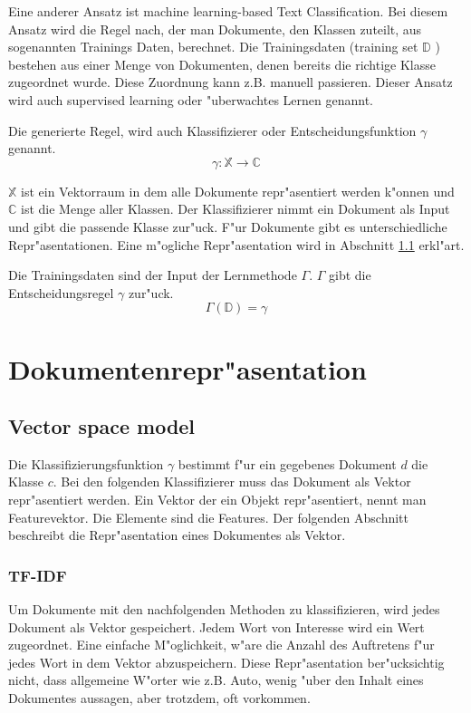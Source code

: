 \documentclass[12pt,a4paper,twoside]{article}
\begin{document}
Eine anderer Ansatz ist machine learning-based Text Classification. Bei diesem Ansatz wird die Regel nach, der man Dokumente, den Klassen zuteilt, aus sogenannten Trainings Daten, berechnet. Die Trainingsdaten (training set $\mathbb{D}$ ) bestehen aus einer Menge von Dokumenten, denen bereits die richtige Klasse zugeordnet wurde. Diese Zuordnung kann z.B. manuell passieren. Dieser Ansatz wird auch supervised learning oder "uberwachtes Lernen genannt. 

Die generierte Regel, wird auch Klassifizierer oder Entscheidungsfunktion $\gamma$ genannt.
\[
\gamma : \mathbb{X} \to \mathbb{C}
\]

$\mathbb{X}$ ist ein Vektorraum in dem alle Dokumente repr"asentiert werden k"onnen und $\mathbb{C}$ ist die Menge aller Klassen. Der Klassifizierer nimmt ein Dokument als Input und gibt die passende Klasse zur"uck. F"ur Dokumente gibt es unterschiedliche Repr"asentationen. Eine m"ogliche Repr"asentation wird in Abschnitt \ref{sec:vectorspacemodel} erkl"art.

Die Trainingsdaten sind der Input der Lernmethode $\Gamma$. $\Gamma$ gibt die Entscheidungsregel $\gamma$ zur"uck.
\[
\Gamma(\mathbb{D}) = \gamma
\]

\section{Dokumentenrepr"asentation}
\label{sec:linearclassifiers}

\subsection{Vector space model}
\label{sec:vectorspacemodel}
Die Klassifizierungsfunktion $\gamma$ bestimmt f"ur ein gegebenes Dokument $d$ die Klasse $c$. Bei den folgenden Klassifizierer muss das Dokument als Vektor re\-pr"as\-entiert werden. Ein Vektor der ein Objekt repr"asentiert, nennt man Featurevektor. Die Elemente sind die Features. Der folgenden Abschnitt beschreibt die Repr"asentation eines Dokumentes als Vektor.

\subsubsection{TF-IDF}
\label{sec:tfidf}

Um Dokumente mit den nachfolgenden Methoden zu klassifizieren, wird jedes Dokument als Vektor gespeichert. Jedem Wort von Interesse wird ein Wert zugeordnet. Eine einfache M"oglichkeit, w"are die Anzahl des Auftretens f"ur jedes Wort in dem Vektor abzuspeichern. Diese Repr"asentation ber"ucksichtig nicht, dass allgemeine W"orter wie z.B. Auto, wenig "uber den Inhalt eines Dokumentes aussagen, aber trotzdem, oft vorkommen.
\end{document}

